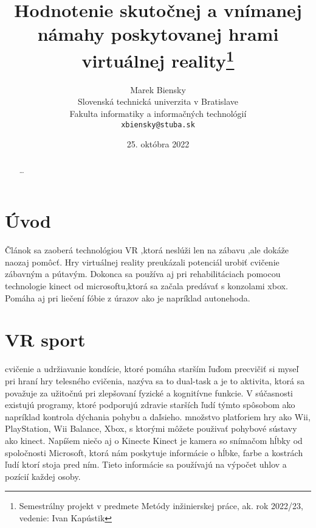 \documentclass[10pt,twoside,slovak,a4paper]{article}
\title{Hodnotenie skutočnej a vnímanej námahy poskytovanej hrami virtuálnej reality\thanks{Semestrálny projekt v predmete Metódy inžinierskej práce, ak. rok 2022/23, vedenie: Ivan Kapústik}}
\author{Marek Biensky\\[2pt]
	{\small Slovenská technická univerzita v Bratislave}\\
	{\small Fakulta informatiky a informačných technológií}\\
	{\small \texttt{xbiensky@stuba.sk}}
	}
\date{\small 25. októbra 2022}
\begin{document}
\maketitle

\begin{abstract}
\ldots
\end{abstract}

\section{Úvod}
Článok sa zaoberá technológiou VR ,ktorá neslúži len na zábavu ,ale dokáže naozaj pomôcť.
Hry virtuálnej reality preukázali potenciál urobiť cvičenie zábavným a pútavým.
Dokonca sa používa aj pri rehabilitáciach pomocou technologie kinect od microsoftu,ktorá sa začala predávať s konzolami xbox.
Pomáha aj pri liečení fóbie z úrazov ako je napríklad autonehoda.


\section{VR sport} \label{VR sport}

cvičenie a udržiavanie kondície, ktoré pomáha starším ľuďom precvičiť si myseľ pri hraní hry
telesného cvičenia, nazýva sa to dual-task a je to aktivita, ktorá sa považuje za užitočnú pri zlepšovaní
fyzické a kognitívne funkcie.
V súčasnosti existujú programy, ktoré podporujú zdravie starších ľudí týmto spôsobom ako napríklad kontrola dýchania pohybu a daľsieho. množstvo platforiem
hry ako Wii, PlayStation, Wii Balance, Xbox, s ktorými môžete použivať pohybové sústavy ako kinect.
Napíšem niečo aj o Kinecte
Kinect je kamera so snímačom hĺbky od spoločnosti Microsoft, ktorá nám poskytuje informácie o hĺbke, farbe a kostrách ľudí
ktorí stoja pred ním. Tieto informácie sa používajú na výpočet uhlov a pozícií každej osoby.


\end{document}
